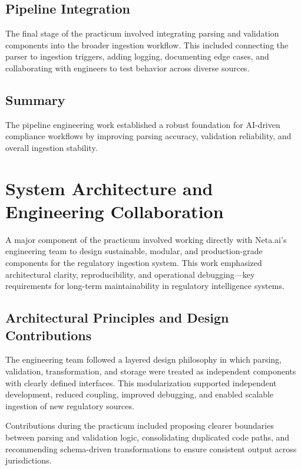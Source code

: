 \documentclass[sigconf]{acmart}
\begin{document}
\subsection{Pipeline Integration}

The final stage of the practicum involved integrating parsing and validation components into the broader ingestion workflow. This included connecting the parser to ingestion triggers, adding logging, documenting edge cases, and collaborating with engineers to test behavior across diverse sources.

\subsection{Summary}

The pipeline engineering work established a robust foundation for AI-driven compliance workflows by improving parsing accuracy, validation reliability, and overall ingestion stability.

\section{System Architecture and Engineering Collaboration}

A major component of the practicum involved working directly with Neta.ai’s engineering team to design sustainable, modular, and production-grade components for the regulatory ingestion system. This work emphasized architectural clarity, reproducibility, and operational debugging—key requirements for long-term maintainability in regulatory intelligence systems.

\subsection{Architectural Principles and Design Contributions}

The engineering team followed a layered design philosophy in which parsing, validation, transformation, and storage were treated as independent components with clearly defined interfaces. This modularization supported independent development, reduced coupling, improved debugging, and enabled scalable ingestion of new regulatory sources.

Contributions during the practicum included proposing clearer boundaries between parsing and validation logic, consolidating duplicated code paths, and recommending schema-driven transformations to ensure consistent output across jurisdictions.
\end{document}

